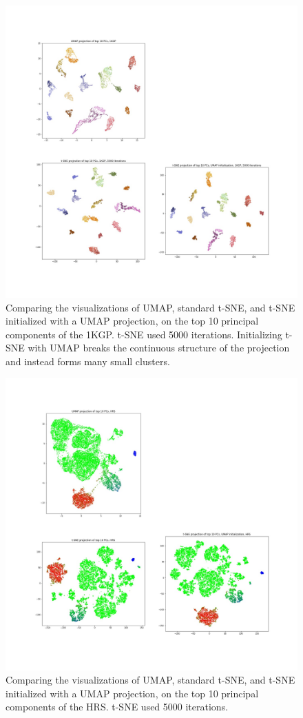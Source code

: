 \documentclass[12pt]{pnas-new}
\begin{document}
\begin{figure}[!htb]
    \centering
    \includegraphics[width=0.95\columnwidth]{images/1KGP_tsne_umap.jpeg}
    \caption{Comparing the visualizations of UMAP, standard t-SNE, and t-SNE initialized with a UMAP projection, on the top 10 principal components of the 1KGP. t-SNE used 5000 iterations. Initializing t-SNE with UMAP breaks the continuous structure of the projection and instead forms many small clusters.}
    \label{fig:supp_tsne_umap_compare_1kgp}
\end{figure}

\begin{figure}[!htb]
    \centering
    \includegraphics[width=0.95\columnwidth]{images/HRS_tsne_umap.jpeg}
    \caption{Comparing the visualizations of UMAP, standard t-SNE, and t-SNE initialized with a UMAP projection, on the top 10 principal components of the HRS. t-SNE used 5000 iterations.}
    \label{fig:supp_tsne_umap_compare_hrs}
\end{figure}
\end{document}
